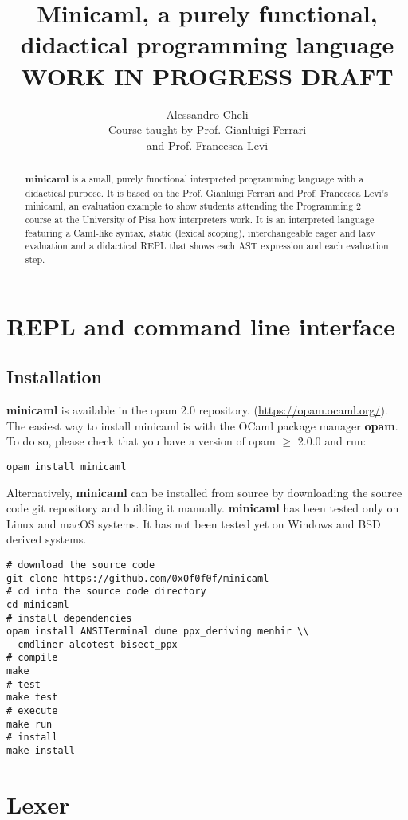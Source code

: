 \documentclass[a4paper, 11pt]{article}
\title{Minicaml, a purely functional, didactical programming language\\WORK IN PROGRESS DRAFT}
\author{Alessandro Cheli\\Course taught by Prof. Gianluigi Ferrari\\and Prof. Francesca Levi}
\theoremstyle{plain}%
\theoremstyle{definition}
\theoremstyle{remark}
\begin{document}
\maketitle

\begin{abstract}
\textbf{minicaml} is a small, purely functional interpreted programming language
with a didactical purpose. It is based on the Prof. Gianluigi Ferrari and Prof.
Francesca Levi's minicaml, an evaluation example to show students attending the
Programming 2 course at the University of Pisa how interpreters work. It is an
interpreted language featuring a Caml-like syntax, static (lexical scoping),
interchangeable eager and lazy evaluation and a didactical REPL that
shows each AST expression and each evaluation step.
\end{abstract}

\section{REPL and command line interface}
\subsection{Installation}
\textbf{minicaml} is available in the opam 2.0 repository.
(\url{https://opam.ocaml.org/}). The easiest way to install minicaml is with the
OCaml package manager \textbf{opam}. To do so, please check that you have a version of opam $\geq$
2.0.0 and run:
\begin{lstlisting}[style=bash]
opam install minicaml
\end{lstlisting}
Alternatively, \textbf{minicaml} can be installed from source by downloading the
source code git repository and building it manually. \textbf{minicaml} has been tested
only on Linux and macOS systems. It has not been tested yet on Windows and BSD
derived systems.
\begin{lstlisting}[style=bash]
# download the source code
git clone https://github.com/0x0f0f0f/minicaml
# cd into the source code directory
cd minicaml
# install dependencies
opam install ANSITerminal dune ppx_deriving menhir \\
  cmdliner alcotest bisect_ppx
# compile
make
# test
make test
# execute
make run
# install
make install
\end{lstlisting}

\clearpage



\section{Lexer}
\end{document}
